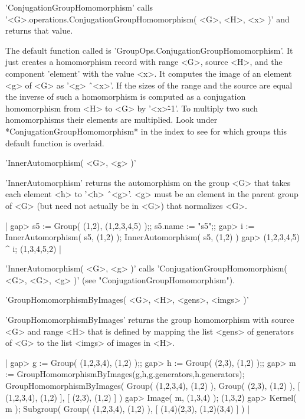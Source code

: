 'ConjugationGroupHomomorphism' calls \\
'<G>.operations.ConjugationGroupHomomorphism( <G>, <H>, <x> )'
and returns that value.

The default  function  called is 'GroupOps.ConjugationGroupHomomorphism'.
It just creates a homomorphism record with range <G>, source <H>, and the
component 'element' with  the value <x>.   It  computes the  image of  an
element <g> of <G> as  '<g> \^\ <x>'.  If the sizes  of the range and the
source are  equal  the inverse  of such  a homomorphism is computed  as a
conjugation homomorphism from <H> to <G> by  '<x>\^-1'.   To multiply two
such   homomorphisms  their   elements   are   multiplied.   Look   under
*ConjugationGroupHomomorphism* in the index to  see for which groups this
default function is overlaid.

%
%

'InnerAutomorphism( <G>, <g> )'

'InnerAutomorphism' returns the automorphism on the  group <G> that takes
each element <h> to '<h> \^\ <g>'.  <g> must be an element  in the parent
group of <G> (but need not actually be in <G>) that normalizes <G>.

|    gap> s5 := Group( (1,2), (1,2,3,4,5) );;  s5.name := "s5";;
    gap> i := InnerAutomorphism( s5, (1,2) );
    InnerAutomorphism( s5, (1,2) )
    gap> (1,2,3,4,5) ^ i;
    (1,3,4,5,2) |

'InnerAutomorphism( <G>, <g> )' calls 'ConjugationGroupHomomorphism( <G>,
<G>, <g> )' (see "ConjugationGroupHomomorphism").

%
%

'GroupHomomorphismByImages( <G>, <H>, <gens>, <imgs> )'

'GroupHomomorphismByImages' returns   the group homomorphism  with source
<G>  and  range  <H> that  is  defined by mapping    the  list <gens>  of
generators of <G> to the list <imgs> of images in <H>.

|    gap> g := Group( (1,2,3,4), (1,2) );;
    gap> h := Group( (2,3), (1,2) );;
    gap> m := GroupHomomorphismByImages(g,h,g.generators,h.generators);
    GroupHomomorphismByImages( Group( (1,2,3,4), (1,2) ), Group( (2,3), 
    (1,2) ), [ (1,2,3,4), (1,2) ], [ (2,3), (1,2) ] )
    gap> Image( m, (1,3,4) );
    (1,3,2)
    gap> Kernel( m );
    Subgroup( Group( (1,2,3,4), (1,2) ), [ (1,4)(2,3), (1,2)(3,4) ] ) |


